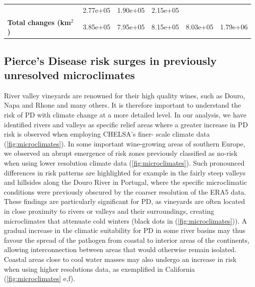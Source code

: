 \begin{table}[H]
{\begin{tabular}{lccccc}
                                                 & 2.77e+05
                                                 & 1.90e+05
                                                 & 2.15e+05
            \\
            \textbf{Total changes (km$^2$)}      & 3.85e+05
                                                 & 7.95e+05
                                                 & 8.15e+05
                                                 & 8.03e+05
                                                 & 1.79e+06
            \\ \hline
        \end{tabular}
    }
\end{table}

\subsection{Pierce's Disease risk surges in previously unresolved
    microclimates}

River valley vineyards are renowned  for their high quality wines, such as
Douro, Napa and Rhone and many others. It is therefore important to understand
the risk of  PD with climate change at	a more detailed level. In our analysis,
we have identified rivers and valleys as specific relief areas where a greater
increase in PD risk is observed when employing CHELSA’s finer- scale climate
data (\cref{fig:microclimates}). In some important wine-growing areas of
southern Europe, we observed an abrupt emergence of risk zones previously
classified as no-risk when using lower resolution climate data
(\cref{fig:microclimates}). Such pronounced differences in risk patterns are
highlighted for example in the fairly steep valleys and hillsides along the
Douro River in Portugal, where the specific microclimatic conditions were
previously obscured by the coarser resolution of the ERA5 data. These findings
are particularly significant for PD,  as vineyards are often located in close
proximity to rivers or valleys and their surroundings, creating microclimates
that attenuate cold winters (black dots in (\cref{fig:microclimates})). A
gradual increase in the climatic suitability for PD in some river basins may
thus favour the spread of the pathogen from coastal  to interior areas of the
continents, allowing interconnection between areas that would otherwise remain
isolated. Coastal areas close to cool water masses may also undergo an increase
in risk  when using higher resolutions data, as exemplified in California
(\cref{fig:microclimates} e,f).

